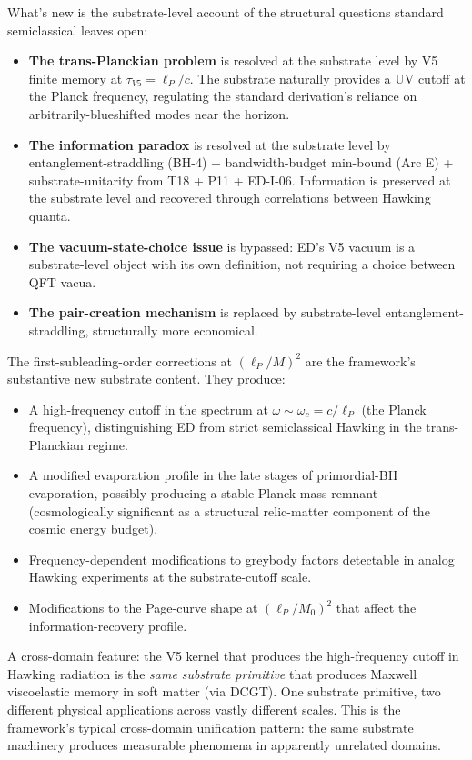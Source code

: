 \documentclass[11pt,a4paper]{article}
\begin{document}
What's new is the substrate-level account of the structural questions standard semiclassical leaves open:

\begin{itemize}[noitemsep]
  \item \textbf{The trans-Planckian problem} is resolved at the substrate level by V5 finite memory at $\tau_{V5} = \ell_P/c$. The substrate naturally provides a UV cutoff at the Planck frequency, regulating the standard derivation's reliance on arbitrarily-blueshifted modes near the horizon.
  \item \textbf{The information paradox} is resolved at the substrate level by entanglement-straddling (BH-4) + bandwidth-budget min-bound (Arc E) + substrate-unitarity from T18 + P11 + ED-I-06. Information is preserved at the substrate level and recovered through correlations between Hawking quanta.
  \item \textbf{The vacuum-state-choice issue} is bypassed: ED's V5 vacuum is a substrate-level object with its own definition, not requiring a choice between QFT vacua.
  \item \textbf{The pair-creation mechanism} is replaced by substrate-level entanglement-straddling, structurally more economical.
\end{itemize}

The first-subleading-order corrections at $(\ell_P/M)^2$ are the framework's substantive new substrate content. They produce:

\begin{itemize}[noitemsep]
  \item A high-frequency cutoff in the spectrum at $\omega \sim \omega_c = c/\ell_P$ (the Planck frequency), distinguishing ED from strict semiclassical Hawking in the trans-Planckian regime.
  \item A modified evaporation profile in the late stages of primordial-BH evaporation, possibly producing a stable Planck-mass remnant (cosmologically significant as a structural relic-matter component of the cosmic energy budget).
  \item Frequency-dependent modifications to greybody factors detectable in analog Hawking experiments at the substrate-cutoff scale.
  \item Modifications to the Page-curve shape at $(\ell_P/M_0)^2$ that affect the information-recovery profile.
\end{itemize}

A cross-domain feature: the V5 kernel that produces the high-frequency cutoff in Hawking radiation is the \emph{same substrate primitive} that produces Maxwell viscoelastic memory in soft matter (via DCGT). One substrate primitive, two different physical applications across vastly different scales. This is the framework's typical cross-domain unification pattern: the same substrate machinery produces measurable phenomena in apparently unrelated domains.
\end{document}
